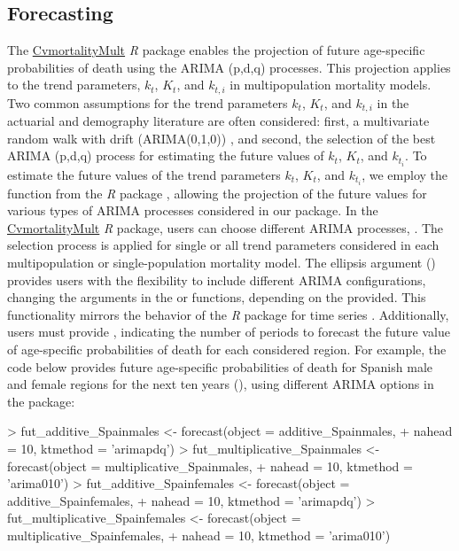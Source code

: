 \subsection{Forecasting}

The \href{https://cran.r-project.org/web/packages/CvmortalityMult/index.html}{CvmortalityMult} \emph{R} package enables the projection of future age-specific probabilities of death using the ARIMA (p,d,q) processes. This projection applies to the trend parameters, $k_t$, $K_t$, and $k_{t,i}$ in multipopulation mortality models. Two common assumptions for the trend parameters $k_t$, $K_t$, and $k_{t,i}$ in the actuarial and demography literature are often considered: first, a multivariate random walk with drift (ARIMA(0,1,0)) \citep{Cairns2006, Cairns2009, Haberman2011, Villegas2017}, and second, the selection of the best ARIMA (p,d,q) process \citep{Renshaw2006, Debon2008, Villegas2017, Atance2020const} for estimating the future values of $k_t$, $K_t$, and $k_{t_i}$. To estimate the future values of the trend parameters $k_t$, $K_t$, and $k_{t_i}$, we employ the  function from the  \emph{R} package \citep{Hyndman2008}, allowing the projection of the future values for various types of ARIMA processes considered in our package. In the \href{https://cran.r-project.org/web/packages/CvmortalityMult/index.html}{CvmortalityMult} \emph{R} package, users can choose different ARIMA processes, {}. The selection process is applied for single or all trend parameters considered in each multipopulation or single-population mortality model. {The ellipsis argument () provides users with} the flexibility to include different ARIMA configurations, changing the arguments in the  or  functions, {depending on the  provided. This functionality mirrors the behavior of the  \emph{R} package for time series \citep{Hyndman2008}.} Additionally, users must provide , indicating the number of periods to forecast the future value of age-specific probabilities of death for each considered region. For example, the code below provides future age-specific probabilities of death for Spanish male and female regions for the next ten years (), using different ARIMA options in the package:
%
\begin{example}
> fut_additive_Spainmales <- forecast(object = additive_Spainmales,
+	nahead = 10, ktmethod = 'arimapdq')
> fut_multiplicative_Spainmales <- forecast(object = multiplicative_Spainmales,
+	nahead = 10, ktmethod = 'arima010')
> fut_additive_Spainfemales <- forecast(object = additive_Spainfemales,
+	nahead = 10, ktmethod = 'arimapdq')
> fut_multiplicative_Spainfemales <- forecast(object = multiplicative_Spainfemales,
+	nahead = 10, ktmethod = 'arima010')
\end{example}
%


